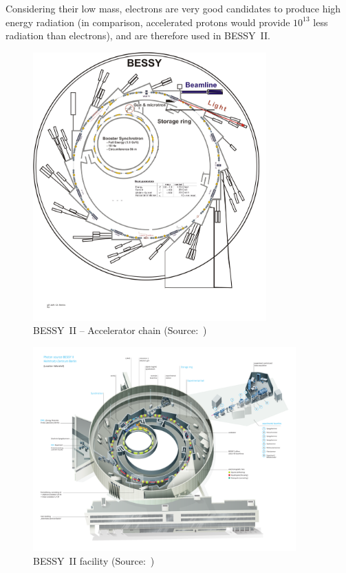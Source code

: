 Considering their low mass, electrons are very good candidates to produce high energy radiation (in comparison, accelerated protons would provide $10^{13}$ less radiation than electrons), and are therefore used in BESSY~II.

\begin{figure}
    \centering
    \includegraphics[width=0.8\textwidth]{img/bessy_acc_chain_web.jpg}
    \caption[BESSY~II -- Accelerator chain]{\label{fig:bessy_acc_web_simple} BESSY~II -- Accelerator chain (Source:~\cite{web:bessy_homepage})}
\end{figure}

\begin{figure}
    \centering
    \includegraphics[width=0.9\textwidth,height=1\textheight,keepaspectratio]{img/bessy_acc_web.pdf}
    \caption[BESSY~II facility]{\label{fig:bessy_acc_web} BESSY~II facility (Source:~\cite{web:bessy_homepage})}
\end{figure}

